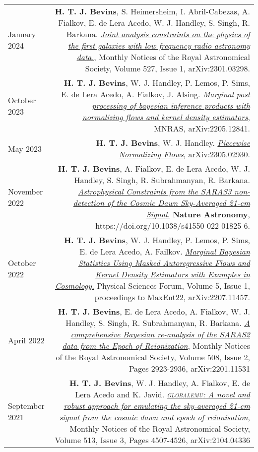 \documentclass{article}
\begin{document}
\begin{tabular}{L!{\vrule}R}
    January 2024 & \textbf{H. T. J. Bevins}, S. Heimersheim, I. Abril-Cabezas, A. Fialkov, E. de Lera Acedo, W. J. Handley, S. Singh, R. Barkana. \href{https://academic.oup.com/mnras/article/527/1/813/7326010?utm_source=advanceaccess&utm_campaign=mnras&utm_medium=email}{\textit{Joint analysis constraints on the physics of the first galaxies with low frequency radio astronomy data.}}, Monthly Notices of the Royal Astronomical Society, Volume 527, Issue 1, arXiv:2301.03298. \\
    October 2023 & \textbf{H. T. J. Bevins}, W. J. Handley, P. Lemos, P. Sims, E. de Lera Acedo, A. Fialkov, J. Alsing. \href{https://arxiv.org/abs/2205.12841}{\textit{Marginal post processing of bayesian inference products with normalizing flows and kernel density estimators}}, MNRAS, arXiv:2205.12841. \\
    May 2023 & \textbf{H. T. J. Bevins}, W. J. Handley. \href{https://arxiv.org/abs/2305.02930}{\textit{Piecewise Normalizing Flows}}, arXiv:2305.02930. \\
    November 2022 & \textbf{H. T. J. Bevins}, A. Fialkov, E. de Lera Acedo, W. J. Handley, S. Singh, R. Subrahmanyan, R. Barkana. \href{https://www.nature.com/articles/s41550-022-01825-6}{\textit{Astrophysical Constraints from the SARAS3 non-detection of the Cosmic Dawn Sky-Averaged 21-cm Signal.}} \textbf{Nature Astronomy}, https://doi.org/10.1038/s41550-022-01825-6.\\
	October 2022 & \textbf{H. T. J. Bevins}, W. J. Handley, P. Lemos, P. Sims, E. de Lera Acedo, A. Failkov. \href{https://www.mdpi.com/2673-9984/5/1/1#abstract}{\textit{Marginal Bayesian Statistics Using Masked Autoregressive Flows and Kernel Density Estimators with Examples in Cosmology.}} Physical Sciences Forum, Volume 5, Issue 1, proceedings to MaxEnt22, arXiv:2207.11457. \\
	April 2022 & \textbf{H. T. J. Bevins}, E. de Lera Acedo, A. Fialkov, W. J. Handley, S. Singh, R. Subrahmanyan, R. Barkana. \href{https://doi.org/10.1093/mnras/stac1158}{\textit{A comprehensive Bayesian re-analysis of the SARAS2 data from the Epoch of Reionization}}, Monthly Notices of the Royal Astronomical Society, Volume 508, Issue 2, Pages 2923-2936, arXiv:2201.11531\\
	September 2021 & \textbf{H. T. J. Bevins}, W. J. Handley, A. Fialkov, E. de Lera Acedo and K. Javid. \href{https://doi.org/10.1093/mnras/stab2737}{\textit{\textsc{globalemu}: A novel and robust approach for emulating the sky-averaged 21-cm signal from the cosmic dawn and epoch of reionisation}}, Monthly Notices of the Royal Astronomical Society, Volume 513, Issue 3, Pages 4507-4526, arXiv:2104.04336 \\

\end{tabular}
\end{document}
